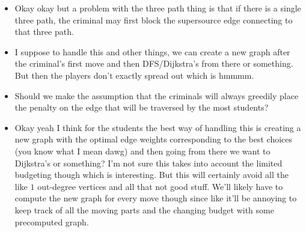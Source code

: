 \documentclass[a4paper, 12pt]{article}
\begin{document}
\begin{itemize}
    \item Okay okay but a problem with the three path thing is that if there is a single three path, the criminal may first block the supersource edge connecting to that three path.

    \item I suppose to handle this and other things, we can create a new graph after the criminal's first move and then DFS/Dijkstra's from there or something. But then the players don't exactly spread out which is hmmmm.

    \item Should we make the assumption that the criminals will always greedily place the penalty on the edge that will be traversed by the most students?

    \item Okay yeah I think for the students the best way of handling this is creating a new graph with the optimal edge weights corresponding to the best choices (you know what I mean dawg) and then going from there we want to Dijkstra's or something? I'm not sure this takes into account the limited budgeting though which is interesting. But this will certainly avoid all the like \( 1 \) out-degree vertices and all that not good stuff. We'll likely have to compute the new graph for every move though since like it'll be annoying to keep track of all the moving parts and the changing budget with some precomputed graph.
\end{itemize}
\end{document}
